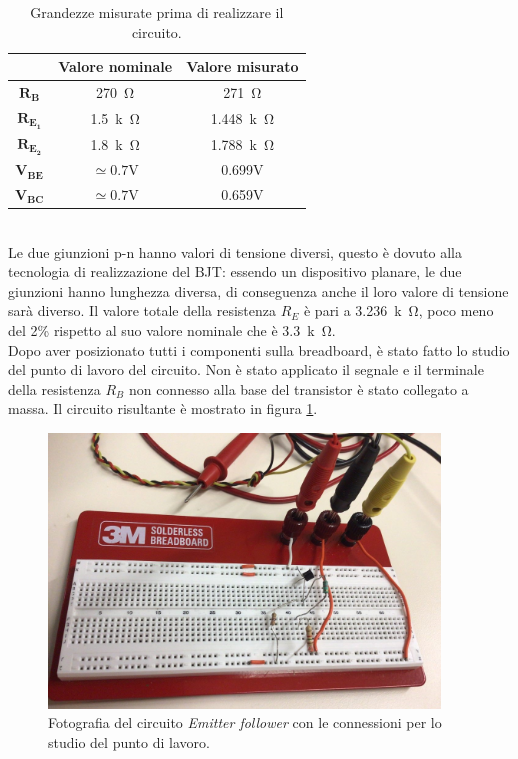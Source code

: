 \documentclass{report}
\begin{document}
\begin{table}[h]
	\centering
	\begin{tabular}{|c|c|c|}
	\cline{2-3} 
	\multicolumn{1}{c|}{} & \textbf{Valore nominale} & \textbf{Valore misurato}\\ 
		\hline
		$\mathbf{R_B}$ & \SI{270}{\ohm} & \SI{271}{\ohm} \\ 
		\hline
		$\mathbf{R_{E_1}}$& \SI{1.5}{k\ohm} & \SI{1.448}{k\ohm} \\ 
		\hline
		$\mathbf{R_{E_2}}$& \SI{1.8}{k\ohm} & \SI{1.788}{k\ohm} \\ 
		\hline
		$\mathbf{V_{BE}}$& $\mathrm{ \simeq0.7V}$ & 0.699V \\ 
		\hline
		$\mathbf{V_{BC}}$& $\mathrm{ \simeq0.7V}$  & 0.659V \\ 
		\hline
	\end{tabular}
	
\caption{Grandezze misurate prima di realizzare il circuito.}
\label{table:EFv1_comp}
\end{table}
\\Le due giunzioni p-n hanno valori di tensione diversi, questo è dovuto alla tecnologia di realizzazione del BJT: essendo un dispositivo planare, le due giunzioni hanno lunghezza diversa, di conseguenza anche il loro valore di tensione sarà diverso. Il valore totale della resistenza $R_E$ è pari a \SI{3.236}{k\ohm}, poco meno del 2\% rispetto al suo valore nominale che è \SI{3.3}{k\ohm}.
\\\indent Dopo aver posizionato tutti i componenti sulla breadboard, è stato fatto lo studio del punto di lavoro del circuito. Non è stato applicato il segnale e il terminale della resistenza $R_B$ non connesso alla base del transistor è stato collegato a massa. Il circuito risultante è mostrato in figura \ref{figura:fotoEFv1_pl}.
\begin{figure}[h]
\centering
\includegraphics[height=7.3cm]{immagini/fotoEFv1_pl}
\caption{Fotografia del circuito \textit{Emitter follower} con le connessioni per lo studio del punto di lavoro.}
\label{figura:fotoEFv1_pl}
\end{figure}
\end{document}
